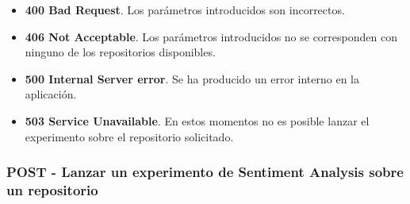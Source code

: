 \begin{itemize}
\begin{itemize}
\begin{itemize}
\begin{itemize}
                        \end{itemize}
                \end{itemize}
            \item[] \textbf{400 Bad Request}. Los parámetros introducidos son incorrectos.
            \item[] \textbf{406 Not Acceptable}. Los parámetros introducidos no se corresponden con ninguno de los repositorios disponibles.
            \item[] \textbf{500 Internal Server error}. Se ha producido un error interno en la aplicación.
            \item[] \textbf{503 Service Unavailable}. En estos momentos no es posible lanzar el experimento sobre el repositorio solicitado.
        \end{itemize}
\end{itemize}

\subsubsection{POST - Lanzar un experimento de Sentiment Analysis sobre un repositorio}

